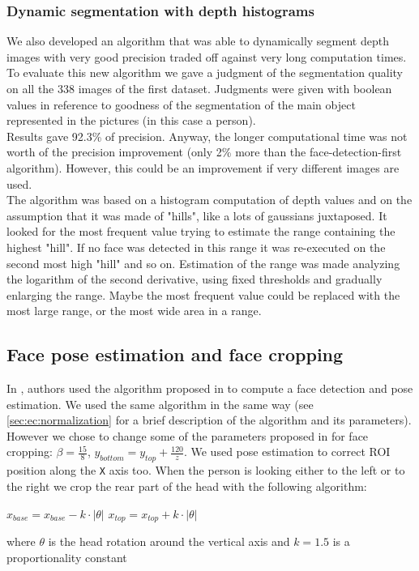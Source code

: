 \documentclass{article}
\begin{document}
		\subsubsection{Dynamic segmentation with depth histograms}
		We also developed an algorithm that was able to dynamically segment depth images with very good precision traded off against very long computation times. \\
		To evaluate this new algorithm we gave a judgment of the segmentation quality on all the 338 images of the first dataset. Judgments were given with boolean values in reference to goodness of the segmentation of the main object represented in the pictures (in this case a person).	\\
		Results gave 92.3\% of precision. Anyway, the longer computational time was not worth of the precision improvement (only 2\% more than the face-detection-first algorithm). However, this could be an improvement if very different images are used. \\
		The algorithm was based on a histogram computation of depth values and on the assumption that it was made of "hills", like a lots of gaussians juxtaposed. It looked for the most frequent value trying to estimate the range containing the highest "hill". If no face was detected in this range it was re-executed on the second most high "hill" and so on. Estimation of the range was made analyzing the logarithm of the second derivative, using fixed thresholds and gradually enlarging the range. Maybe the most frequent value could be replaced with the most large range, or the most wide area in a range.

	\subsection{Face pose estimation and face cropping}	\label{sec:cropping}
	In \citep{Hayat2016}, authors used the algorithm proposed in \citep{Fanelli2011} to compute a face detection and pose estimation. We used the same algorithm in the same way (see \ref{sec:ec:normalization} for a brief description of the algorithm and its parameters). However we chose to change some of the parameters proposed in \citep{Hayat2016} for face cropping: $\beta = \frac{15}{8}$, $y_{bottom} = y_{top} + \frac{120}{z}$. We used pose estimation to correct ROI position along the \verb|X| axis too. When the person is looking either to the left or to the right we crop the rear part of the head with the following algorithm:
	\begin{algorithm}
	\begin{algorithmic}[1]
			\State $x_{base} = x_{base} - k \cdot |\theta|$
		\Else
			\State $x_{top} = x_{top} + k \cdot |\theta|$
		\EndIf
	\end{algorithmic}
	\end{algorithm}
	where $\theta$ is the head rotation around the vertical axis and $k = 1.5$ is a proportionality constant 
	
\end{document}
